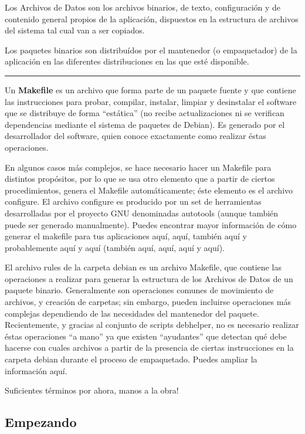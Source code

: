 \documentclass[letterpaper,12pt,spanish]{manual}
\begin{document}
Los Archivos de Datos son los archivos binarios, de texto, configuración y de contenido general propios de la aplicación, dispuestos en la estructura de archivos del sistema tal cual van a ser copiados.

Los paquetes binarios son distribuídos por el mantenedor (o empaquetador) de la aplicación en las diferentes distribuciones en las que esté disponible.


\bigskip\hrule{}\bigskip


Un \textbf{Makefile} es un archivo que forma parte de un paquete fuente y que contiene las instrucciones para probar, compilar, instalar, limpiar y desinstalar el software que se distribuye de forma “estática” (no recibe actualizaciones ni se verifican dependencias mediante el sistema de paquetes de Debian). Es generado por el desarrollador del software, quien conoce exactamente como realizar éstas operaciones.

En algunos casos más complejos, se hace necesario hacer un Makefile para distintos propósitos, por lo que se usa otro elemento que a partir de ciertos procedimientos, genera el Makefile automáticamente; éste elemento es el archivo configure. El archivo configure es producido por un set de herramientas desarrolladas por el proyecto GNU denominadas autotools (aunque también puede ser generado manualmente). Puedes encontrar mayor información de cómo generar el makefile para tus aplicaciones aquí, aquí, también aquí y probablemente aquí y aquí (también aquí, aquí, aquí y aquí).

El archivo rules de la carpeta debian es un archivo Makefile, que contiene las operaciones a realizar para generar la estructura de los Archivos de Datos de un paquete binario. Generalmente son operaciones comunes de movimiento de archivos, y creación de carpetas; sin embargo, pueden incluirse operaciones más complejas dependiendo de las necesidades del mantenedor del paquete. Recientemente, y gracias al conjunto de scripts debhelper, no es necesario realizar éstas operaciones “a mano” ya que existen “ayudantes” que detectan qué debe hacerse con cuales archivos a partir de la presencia de ciertas instrucciones en la carpeta debian durante el proceso de empaquetado. Puedes ampliar la información aquí.

Suficientes términos por ahora, manos a la obra!


\subsection{Empezando}
\end{document}
